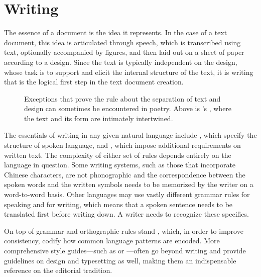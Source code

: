 \chapter{Writing}
The essence of a document is the idea it represents. In the case of a text
document, this idea is articulated through speech, which is transcribed using
text, optionally accompanied by figures, and then laid out on a sheet of paper
according to a design. Since the text is typically independent on the design,
whose task is to support and elicit the internal structure of the text, it is
writing that is the logical first step in the text document creation.

\begin{figure}
  
  \caption{Exceptions that prove the rule about the separation of text and
    design can sometimes be encountered in poetry. Above is 's , where the text and its
    form are intimately intertwined.}
\end{figure}

The essentials of writing in any given natural language include , which specify the structure of spoken
language, and , which
impose additional requirements on written text. The complexity of either set of
rules depends entirely on the language in question. Some writing systems, such
as those that incorporate Chinese characters, are not phonographic and the
correspondence between the spoken words and the written symbols needs to be
memorized by the writer on a word-to-word basis. Other languages may use vastly
different grammar rules for speaking and for writing, which means that a spoken
sentence needs to be translated first before writing down. A writer needs to
recognize these specifics.

On top of grammar and orthographic rules stand , which, in
order to improve consistency, codify how common language patterns are encoded.
More comprehensive style guides---such as  or
---often go beyond writing and provide guidelines on design and typesetting as
well, making them an indispensable reference on the editorial tradition.

